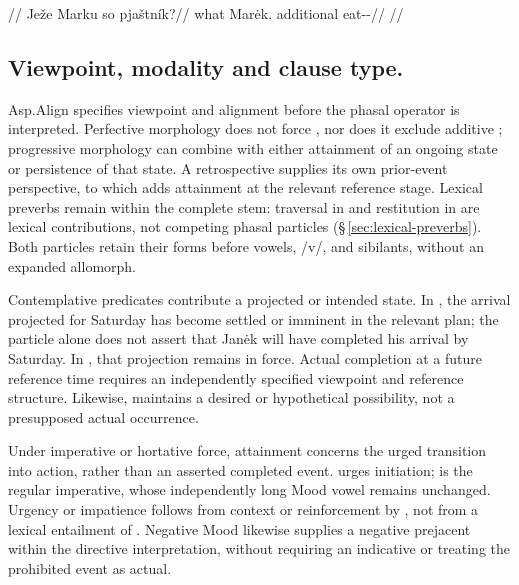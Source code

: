 \pex
\begingl
\glpreamble {}//
\gla Ježe Marku so pjaštník?//
\glb what Marėk.\Trs{} additional eat-\Trs{}-\Pf{}//
\glft {}//
\endgl
\xe

\subsection{Viewpoint, modality and clause type.}
Asp.Align specifies viewpoint and alignment before the phasal operator is
interpreted. Perfective morphology does not force , nor does it
exclude additive ; progressive morphology can combine with either
attainment of an ongoing state or persistence of that state. A retrospective
supplies its own prior-event perspective, to which  adds attainment
at the relevant reference stage. Lexical preverbs remain within the complete
stem: traversal in  and restitution in  are
lexical contributions, not competing phasal particles
(§\,\ref{sec:lexical-preverbs}). Both particles retain their forms before
vowels, /v/, and sibilants, without an expanded allomorph.

Contemplative predicates contribute a projected or intended state. In
, the arrival projected for Saturday has become
settled or imminent in the relevant plan; the particle alone does not assert
that Janėk will have completed his arrival by Saturday. In
, that projection remains in force. Actual
completion at a future reference time requires an independently specified
viewpoint and reference structure. Likewise,  maintains a
desired or hypothetical possibility, not a presupposed actual occurrence.

Under imperative or hortative force, attainment concerns the urged transition
into action, rather than an asserted completed event. 
 urges initiation;  is the regular
imperative, whose independently long Mood vowel remains unchanged. Urgency or
impatience follows from context or reinforcement by , not from a
lexical entailment of . Negative Mood likewise supplies a negative
prejacent within the directive interpretation, without requiring an indicative
 or treating the prohibited event as actual.

